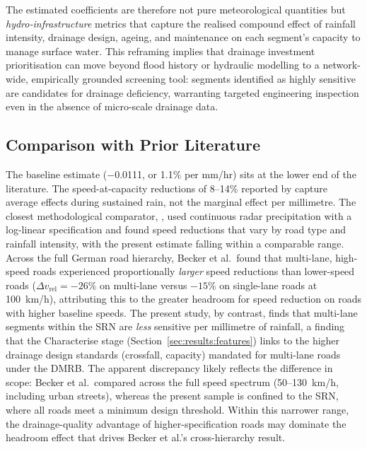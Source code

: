 \documentclass[review,authoryear]{elsarticle}
\begin{document}
The estimated coefficients are therefore not pure meteorological quantities but \textit{hydro-infrastructure} metrics that capture the realised compound effect of rainfall intensity, drainage design, ageing, and maintenance on each segment's capacity to manage surface water. This reframing implies that drainage investment prioritisation can move beyond flood history or hydraulic modelling to a network-wide, empirically grounded screening tool: segments identified as highly sensitive are candidates for drainage deficiency, warranting targeted engineering inspection even in the absence of micro-scale drainage data.

\subsection{Comparison with Prior Literature}
\label{sec:disc:lit}

The baseline estimate ($-$0.0111, or 1.1\% per \si{mm/hr}) sits at the lower end of the literature. The speed-at-capacity reductions of 8--14\% reported by \citet{hranac2006empirical} capture average effects during sustained rain, not the marginal effect per millimetre. The closest methodological comparator, \citet{becker2026rainfall}, used continuous radar precipitation with a log-linear specification and found speed reductions that vary by road type and rainfall intensity, with the present estimate falling within a comparable range. Across the full German road hierarchy, Becker et al.\ found that multi-lane, high-speed roads experienced proportionally \textit{larger} speed reductions than lower-speed roads ($\Delta v_{\text{rel}} = -26\%$ on multi-lane versus $-15\%$ on single-lane roads at 100~km/h), attributing this to the greater headroom for speed reduction on roads with higher baseline speeds. The present study, by contrast, finds that multi-lane segments within the SRN are \textit{less} sensitive per millimetre of rainfall, a finding that the Characterise stage (Section~\ref{sec:results:features}) links to the higher drainage design standards (crossfall, capacity) mandated for multi-lane roads under the DMRB. The apparent discrepancy likely reflects the difference in scope: Becker et al.\ compared across the full speed spectrum (50--130~km/h, including urban streets), whereas the present sample is confined to the SRN, where all roads meet a minimum design threshold. Within this narrower range, the drainage-quality advantage of higher-specification roads may dominate the headroom effect that drives Becker et al.'s cross-hierarchy result.
\end{document}
